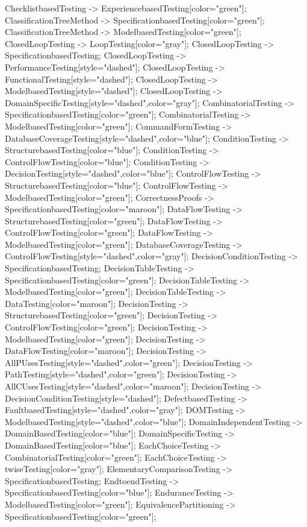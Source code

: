 \documentclass{article}
\begin{document}
{ChecklistbasedTesting -> ExperiencebasedTesting[color="green"];
ClassificationTreeMethod -> SpecificationbasedTesting[color="green"];
ClassificationTreeMethod -> ModelbasedTesting[color="green"];
ClosedLoopTesting -> LoopTesting[color="gray"];
ClosedLoopTesting -> SpecificationbasedTesting;
ClosedLoopTesting -> PerformanceTesting[style="dashed"];
ClosedLoopTesting -> FunctionalTesting[style="dashed"];
ClosedLoopTesting -> ModelbasedTesting[style="dashed"];
ClosedLoopTesting -> DomainSpecificTesting[style="dashed",color="gray"];
CombinatorialTesting -> SpecificationbasedTesting[color="green"];
CombinatorialTesting -> ModelbasedTesting[color="green"];
CommandFormTesting -> DatabaseCoverageTesting[style="dashed",color="blue"];
ConditionTesting -> StructurebasedTesting[color="blue"];
ConditionTesting -> ControlFlowTesting[color="blue"];
ConditionTesting -> DecisionTesting[style="dashed",color="blue"];
ControlFlowTesting -> StructurebasedTesting[color="blue"];
ControlFlowTesting -> ModelbasedTesting[color="green"];
CorrectnessProofs -> SpecificationbasedTesting[color="maroon"];
DataFlowTesting -> StructurebasedTesting[color="green"];
DataFlowTesting -> ControlFlowTesting[color="green"];
DataFlowTesting -> ModelbasedTesting[color="green"];
DatabaseCoverageTesting -> ControlFlowTesting[style="dashed",color="gray"];
DecisionConditionTesting -> SpecificationbasedTesting;
DecisionTableTesting -> SpecificationbasedTesting[color="green"];
DecisionTableTesting -> ModelbasedTesting[color="green"];
DecisionTableTesting -> DataTesting[color="maroon"];
DecisionTesting -> StructurebasedTesting[color="green"];
DecisionTesting -> ControlFlowTesting[color="green"];
DecisionTesting -> ModelbasedTesting[color="green"];
DecisionTesting -> DataFlowTesting[color="maroon"];
DecisionTesting -> AllPUsesTesting[style="dashed",color="green"];
DecisionTesting -> PathTesting[style="dashed",color="green"];
DecisionTesting -> AllCUsesTesting[style="dashed",color="maroon"];
DecisionTesting -> DecisionConditionTesting[style="dashed"];
DefectbasedTesting -> FaultbasedTesting[style="dashed",color="gray"];
DOMTesting -> ModelbasedTesting[style="dashed",color="blue"];
DomainIndependentTesting -> DomainBasedTesting[color="blue"];
DomainSpecificTesting -> DomainBasedTesting[color="blue"];
EachChoiceTesting -> CombinatorialTesting[color="green"];
EachChoiceTesting -> twiseTesting[color="gray"];
ElementaryComparisonTesting -> SpecificationbasedTesting;
EndtoendTesting -> SpecificationbasedTesting[color="blue"];
EnduranceTesting -> ModelbasedTesting[color="green"];
EquivalencePartitioning -> SpecificationbasedTesting[color="green"];
}
\end{document}
